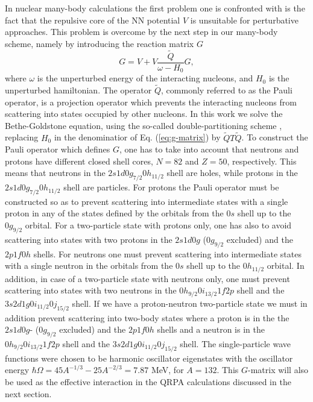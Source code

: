 In nuclear many-body calculations the first problem one is
confronted with is the fact that the repulsive core of the NN potential $V$
is unsuitable for perturbative approaches. This problem is overcome by 
the next
step in our many-body scheme, namely 
by introducing the reaction matrix $G$
\begin{equation}
    G=V+V\frac{\tilde{Q}}{\omega - H_0}G,
     \label{eq:g-matrix}
\end{equation}
where $\omega$ is the unperturbed energy of the interacting nucleons,
and $H_0$ is the unperturbed hamiltonian. 
The operator $\tilde{Q}$, commonly referred to
as the Pauli operator, is a projection operator which prevents the
interacting nucleons from scattering into states occupied by other nucleons.
In this work we solve the Bethe-Goldstone equation, using the so-called 
double-partitioning 
scheme \cite{hko95,brandow67,brown71}, replacing $H_{0}$ in the denominatior 
of  Eq. (\ref{eq:g-matrix}) by $\tilde{Q} T \tilde{Q}$. 
To construct the Pauli operator which defines $G$, one has to take 
into account that neutrons and protons have different closed shell
cores, $N=82$ and $Z=50$, respectively.
This means that neutrons in the $2s1d0g_{7/2}0h_{11/2}$ shell
are holes, while protons in the $2s1d0g_{7/2}0h_{11/2}$ shell
are particles. For protons the  Pauli operator must be constructed so as to
prevent scattering into intermediate states with a single
proton in any of the
states defined by the orbitals from the $0s$ shell up to the
$0g_{9/2}$ orbital. For a two-particle state with protons only, one has 
also to avoid scattering 
into states with two protons in the $2s1d0g$ ($0g_{9/2}$ excluded)
and the $2p1f0h$ shells. For neutrons one must
prevent scattering into intermediate states with a single neutron
in the orbitals from the $0s$ shell up to the
$0h_{11/2}$ orbital. In addition, in case of a two-particle
state with neutrons only, one must prevent scattering into states
with two neutrons in the $0h_{9/2}0i_{13/2}1f2p$ shell
and the $3s2d1g0i_{11/2}0j_{15/2}$ shell. 
If we have a proton-neutron two-particle state we must in addition prevent
scattering into two-body states where a proton is in the 
the $2s1d0g$- ($0g_{9/2}$ excluded)
and the $2p1f0h$ shells and a neutron is in the 
$0h_{9/2}0i_{13/2}1f2p$ shell
and the $3s2d1g0i_{11/2}0j_{15/2}$ shell.
The single-particle wave functions were chosen to be harmonic oscillator 
eigenstates with the oscillator energy 
$\hbar\Omega = 45A^{-1/3} - 25A^{-2/3}=7.87 $ MeV,  for $A=132$.
This $G$-matrix will also be used as the effective
interaction in the QRPA calculations discussed
in the next section. 

